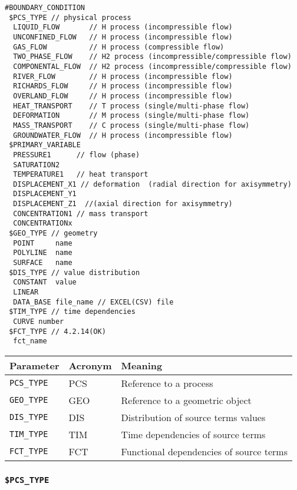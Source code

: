 \begin{verbatim}
#BOUNDARY_CONDITION
 $PCS_TYPE // physical process
  LIQUID_FLOW       // H process (incompressible flow)
  UNCONFINED_FLOW   // H process (incompressible flow)
  GAS_FLOW          // H process (compressible flow)
  TWO_PHASE_FLOW    // H2 process (incompressible/compressible flow)
  COMPONENTAL_FLOW  // H2 process (incompressible/compressible flow)
  RIVER_FLOW        // H process (incompressible flow)
  RICHARDS_FLOW     // H process (incompressible flow)
  OVERLAND_FLOW     // H process (incompressible flow)
  HEAT_TRANSPORT    // T process (single/multi-phase flow)
  DEFORMATION       // M process (single/multi-phase flow)
  MASS_TRANSPORT    // C process (single/multi-phase flow)
  GROUNDWATER_FLOW  // H process (incompressible flow)
 $PRIMARY_VARIABLE
  PRESSURE1      // flow (phase)
  SATURATION2
  TEMPERATURE1   // heat transport
  DISPLACEMENT_X1 // deformation  (radial direction for axisymmetry)
  DISPLACEMENT_Y1
  DISPLACEMENT_Z1  //(axial direction for axisymmetry)
  CONCENTRATION1 // mass transport
  CONCENTRATIONx
 $GEO_TYPE // geometry
  POINT     name
  POLYLINE  name
  SURFACE   name
 $DIS_TYPE // value distribution
  CONSTANT  value
  LINEAR
  DATA_BASE file_name // EXCEL(CSV) file
 $TIM_TYPE // time dependencies
  CURVE number
 $FCT_TYPE // 4.2.14(OK)
  fct_name
\end{verbatim}


\begin{tabular*}{12.773cm}{|p{}|p{1.5cm}|p{7cm}|} \hline
Parameter          & Acronym & Meaning \\ \hline \hline
%
\texttt{PCS\_TYPE} & PCS &  Reference to a process \\
\texttt{GEO\_TYPE} & GEO &  Reference to a geometric object \\
\texttt{DIS\_TYPE} & DIS &  Distribution of source terms values \\
\texttt{TIM\_TYPE} & TIM &  Time dependencies of source terms \\
\texttt{FCT\_TYPE} & FCT &  Functional dependencies of source terms \\
\hline
\end{tabular*}

\subsubsection{\texttt{\$PCS\_TYPE}}

